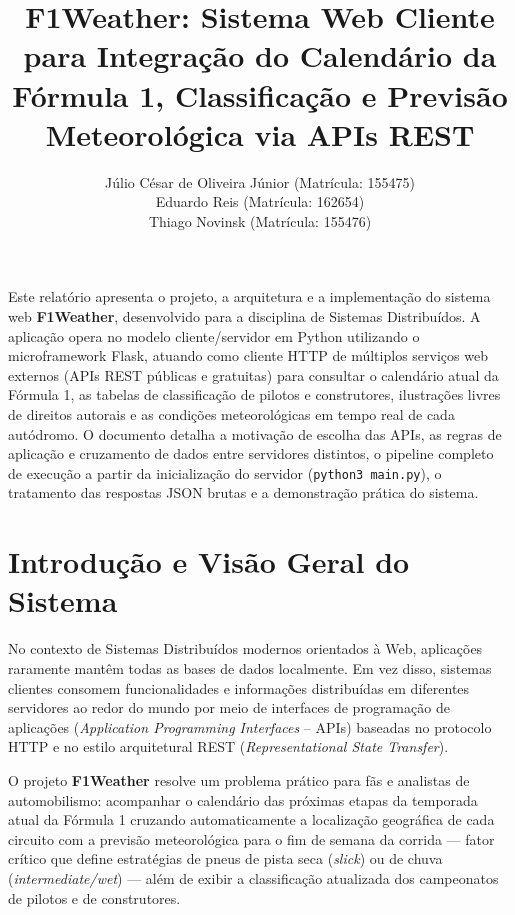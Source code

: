 \documentclass[12pt]{article}
\title{F1Weather: Sistema Web Cliente para Integração do Calendário da Fórmula 1, Classificação e Previsão Meteorológica via APIs REST}
\author{
    Júlio César de Oliveira Júnior\inst{1} (Matrícula: 155475) \\
    Eduardo Reis\inst{1} (Matrícula: 162654) \\
    Thiago Novinsk\inst{1} (Matrícula: 155476)
}
\begin{document}
\maketitle

\begin{resumo}
  Este relatório apresenta o projeto, a arquitetura e a implementação do sistema web \textbf{F1Weather}, desenvolvido para a disciplina de Sistemas Distribuídos. A aplicação opera no modelo cliente/servidor em Python utilizando o microframework Flask, atuando como cliente HTTP de múltiplos serviços web externos (APIs REST públicas e gratuitas) para consultar o calendário atual da Fórmula 1, as tabelas de classificação de pilotos e construtores, ilustrações livres de direitos autorais e as condições meteorológicas em tempo real de cada autódromo. O documento detalha a motivação de escolha das APIs, as regras de aplicação e cruzamento de dados entre servidores distintos, o pipeline completo de execução a partir da inicialização do servidor (\texttt{python3 main.py}), o tratamento das respostas JSON brutas e a demonstração prática do sistema.
\end{resumo}

\section{Introdução e Visão Geral do Sistema}

No contexto de Sistemas Distribuídos modernos orientados à Web, aplicações raramente mantêm todas as bases de dados localmente. Em vez disso, sistemas clientes consomem funcionalidades e informações distribuídas em diferentes servidores ao redor do mundo por meio de interfaces de programação de aplicações (\textit{Application Programming Interfaces} -- APIs) baseadas no protocolo HTTP e no estilo arquitetural REST (\textit{Representational State Transfer}).

O projeto \textbf{F1Weather} resolve um problema prático para fãs e analistas de automobilismo: acompanhar o calendário das próximas etapas da temporada atual da Fórmula 1 cruzando automaticamente a localização geográfica de cada circuito com a previsão meteorológica para o fim de semana da corrida — fator crítico que define estratégias de pneus de pista seca (\textit{slick}) ou de chuva (\textit{intermediate/wet}) — além de exibir a classificação atualizada dos campeonatos de pilotos e de construtores.
\end{document}
